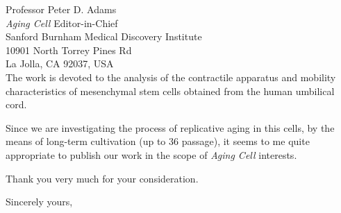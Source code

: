 \documentclass[11pt]{letter} %
\begin{document}
\begin{letter}{
Professor Peter D. Adams \\
\emph{Aging Cell} Editor-in-Chief \\
Sanford Burnham Medical Discovery Institute \\
10901 North Torrey Pines Rd \\
La Jolla, CA 92037, USA\\}
The work is devoted to the analysis of the contractile apparatus and mobility characteristics of mesenchymal stem cells obtained from the human umbilical cord.

Since we are investigating the process of replicative aging in this cells, by the means of long-term cultivation (up to 36 passage), it seems to me quite appropriate to publish our work in the scope of \emph{Aging Cell} interests.

Thank you very much for your consideration.

\closing{Sincerely yours, }




\end{letter}
\end{document}
